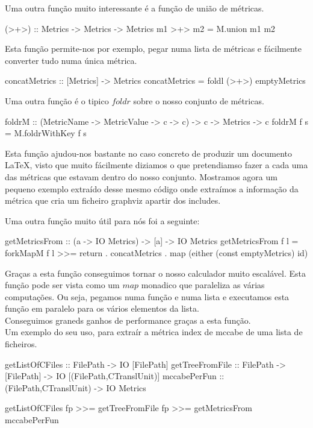Uma outra função muito interessante é a função de união de métricas.
\begin{haskell}
(>+>) :: Metrics -> Metrics -> Metrics
m1 >+> m2 = M.union m1 m2
\end{haskell}

Esta função permite-nos por exemplo, pegar numa lista de métricas e fácilmente
converter tudo numa única métrica.
\begin{haskell}
concatMetrics :: [Metrics] -> Metrics
concatMetrics = foldl (>+>) emptyMetrics
\end{haskell}

Uma outra função é o tipico $foldr$ sobre o nosso conjunto de métricas.
\begin{haskell}
foldrM :: (MetricName -> MetricValue -> c -> c) -> c -> Metrics -> c
foldrM f s = M.foldrWithKey f s
\end{haskell}

Esta função ajudou-nos bastante no caso concreto de produzir um documento \LaTeX,
visto que muito fácilmente diziamos o que pretendiamso fazer a cada uma
das métricas que estavam dentro do nosso conjunto. Mostramos agora
um pequeno exemplo extraído desse mesmo código onde extraímos a informação
da métrica que cria um ficheiro graphviz apartir dos includes.

Uma outra função muito útil para nós foi a seguinte:
\begin{haskell}
getMetricsFrom :: (a -> IO Metrics) -> [a] -> IO Metrics
getMetricsFrom f l =
    forkMapM f l >>=
        return . concatMetrics . map (either (const emptyMetrics) id)
\end{haskell}
Graças a esta função conseguimos tornar o nosso calculador muito escalável.
Esta função pode ser vista como um $map$ monadico que paraleliza as várias
computações. Ou seja, pegamos numa função e numa lista e executamos esta função
em paralelo para os vários elementos da lista.\\
Conseguimos graneds ganhos de performance graças a esta função.\\

Um exemplo do seu uso, para extraír a métrica index de mccabe de uma lista
de ficheiros.
\begin{haskell}
getListOfCFiles :: FilePath -> IO [FilePath]
getTreeFromFile :: FilePath -> [FilePath] -> IO [(FilePath,CTranslUnit)]
mccabePerFun :: (FilePath,CTranslUnit) -> IO Metrics

getListOfCFiles fp >>= getTreeFromFile fp >>= getMetricsFrom mccabePerFun
\end{haskell}


